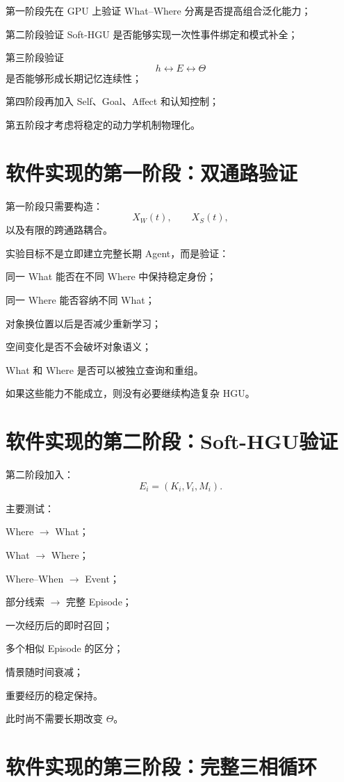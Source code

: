 第一阶段先在 GPU 上验证 What--Where 分离是否提高组合泛化能力；

第二阶段验证 Soft-HGU 是否能够实现一次性事件绑定和模式补全；

第三阶段验证
\[
h\leftrightarrow E\leftrightarrow\Theta
\]
是否能够形成长期记忆连续性；

第四阶段再加入 Self、Goal、Affect 和认知控制；

第五阶段才考虑将稳定的动力学机制物理化。

\section{软件实现的第一阶段：双通路验证}

第一阶段只需要构造：
\[
X_W(t),
\qquad
X_S(t),
\]
以及有限的跨通路耦合。

实验目标不是立即建立完整长期 Agent，而是验证：

同一 What 能否在不同 Where 中保持稳定身份；

同一 Where 能否容纳不同 What；

对象换位置以后是否减少重新学习；

空间变化是否不会破坏对象语义；

What 和 Where 是否可以被独立查询和重组。

如果这些能力不能成立，则没有必要继续构造复杂 HGU。

\section{软件实现的第二阶段：Soft-HGU验证}

第二阶段加入：
\[
E_i=(K_i,V_i,M_i).
\]

主要测试：

Where $\rightarrow$ What；

What $\rightarrow$ Where；

Where--When $\rightarrow$ Event；

部分线索 $\rightarrow$ 完整 Episode；

一次经历后的即时召回；

多个相似 Episode 的区分；

情景随时间衰减；

重要经历的稳定保持。

此时尚不需要长期改变 $\Theta$。

\section{软件实现的第三阶段：完整三相循环}

